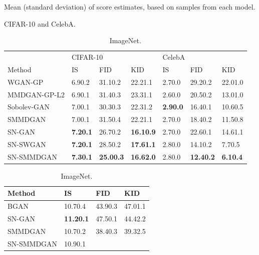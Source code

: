 \documentclass{article}
\begin{document}
\begin{table}[ht]
  \centering
  \caption{Mean (standard deviation) of score estimates, based on  samples from each model.} \label{tab:scores}
  \begin{subtable}[t]{\linewidth}
    \centering
    \caption{CIFAR-10 and CelebA.}
    \label{tab:celebA_cifar10_scores}
    \begin{tabular}{lllllll}
\toprule
{} & \multicolumn{3}{l}{CIFAR-10} & \multicolumn{3}{l}{CelebA} \\
Method &                                    IS &                                    FID &                       KID &                                    IS &                                    FID &                      KID \\
\midrule
WGAN-GP      &             6.90.2 &             31.10.2 &             22.21.1 &             2.70.0 &             29.20.2 &            22.01.0 \\
MMDGAN-GP-L2 &             6.90.1 &             31.40.3 &             23.31.1 &             2.60.0 &             20.50.2 &            13.01.0 \\
Sobolev-GAN  &             7.00.1 &             30.30.3 &             22.31.2 &     \textbf{2.90.0}&             16.40.1 &            10.60.5 \\
SMMDGAN      &             7.00.1 &             31.50.4 &             22.21.1 &             2.70.0 &             18.40.2 &            11.50.8 \\
SN-GAN       &     \textbf{7.20.1}&             26.70.2 &    \textbf{16.10.9} &             2.70.0 &             22.60.1 &            14.61.1 \\
SN-SWGAN     &     \textbf{7.20.1}&             28.50.2 &    \textbf{17.61.1} &             2.80.0 &             14.10.2 &            \phantom{0}7.70.5 \\
SN-SMMDGAN   &     \textbf{7.30.1}&     \textbf{25.00.3}&    \textbf{16.62.0} &             2.80.0 &     \textbf{12.40.2}&  \textbf{\phantom{0}6.10.4} \\
\bottomrule
\end{tabular}
   \end{subtable}
  \begin{subtable}[t]{\linewidth}
    \centering
    \caption{ImageNet.}
    \label{tab:imagenet_scores}
    \begin{tabular}{llll}
\toprule
Method &                                     IS &                                    FID &                       KID \\
\midrule
BGAN       &             10.70.4 &             43.90.3 &             47.01.1 \\
SN-GAN     &             \textbf{11.20.1} &             47.50.1 &             44.42.2 \\
SMMDGAN    &             10.70.2 &             38.40.3 &             39.32.5 \\
SN-SMMDGAN & 10.90.1 &  \mathsmaller{\pm} &  \mathsmaller{\pm} \\
\bottomrule
\end{tabular}
   \end{subtable}
\end{table}
\end{document}
